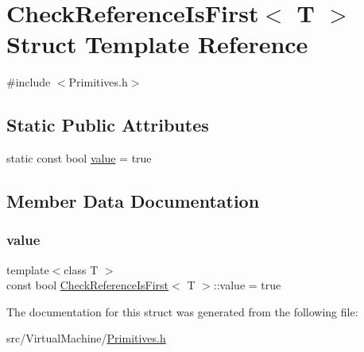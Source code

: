 \hypertarget{struct_check_reference_is_first_3_01_t_01_4}{}\section{Check\+Reference\+Is\+First$<$ T $>$ Struct Template Reference}
\label{struct_check_reference_is_first_3_01_t_01_4}


{\ttfamily \#include $<$Primitives.\+h$>$}

\subsection*{Static Public Attributes}
\begin{DoxyCompactItemize}
\item 
static const bool \hyperlink{struct_check_reference_is_first_3_01_t_01_4_aa06e980782a7c07ee58484ee20974f5c}{value} = true
\end{DoxyCompactItemize}


\subsection{Member Data Documentation}
\mbox{\label{struct_check_reference_is_first_3_01_t_01_4_aa06e980782a7c07ee58484ee20974f5c}} 
\subsubsection{\texorpdfstring{value}{value}}
{\footnotesize\ttfamily template$<$class T $>$ \\
const bool \hyperlink{struct_check_reference_is_first}{Check\+Reference\+Is\+First}$<$ T $>$\+::value = true\hspace{0.3cm}{\ttfamily [static]}}



The documentation for this struct was generated from the following file\+:\begin{DoxyCompactItemize}
\item 
src/\+Virtual\+Machine/\hyperlink{_primitives_8h}{Primitives.\+h}\end{DoxyCompactItemize}
